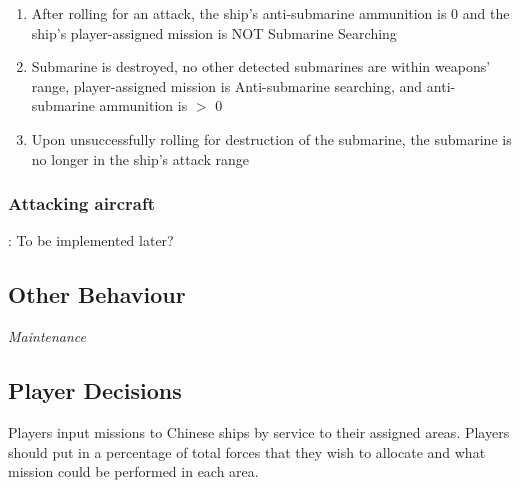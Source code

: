 \documentclass{article}
\begin{document}
\begin{itemize}
\begin{enumerate}[label=\arabic*)]
                \item After rolling for an attack, the ship's anti-submarine ammunition is 0 and the ship's player-assigned mission is NOT Submarine Searching \par
                [Ship resumes player-assigned mission]
                \item Submarine is destroyed, no other detected submarines are within weapons' range, player-assigned mission is Anti-submarine searching, and anti-submarine ammunition is $>$ 0\par
                [Ship's mission becomes Antisubmarine searching]
                \item Upon unsuccessfully rolling for destruction of the submarine, the submarine is no longer in the ship's attack range\par
                [Ship resumes player-assigned mission]
            \end{enumerate}
        \end{itemize}

    \subsubsection{Attacking aircraft}: To be implemented later?

\subsection{Other Behaviour}
        \noindent \textit{Maintenance} \\

\subsection{Player Decisions}
    Players input missions to Chinese ships by service to their assigned areas. Players should put in a percentage of total forces that they wish to allocate and what mission could be performed in each area.
    
\end{document}
